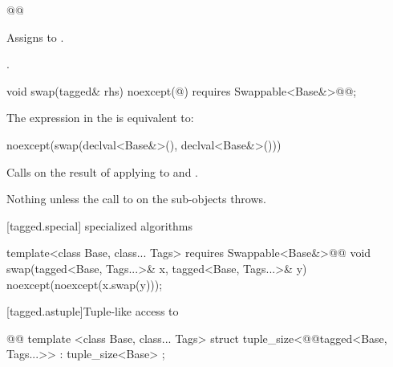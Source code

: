 {\begin{itemdescr}
\begin{codeblock}
@@
\end{codeblock}

\pnum
\effects Assigns  to .

\pnum
\returns {}.
\end{itemdescr}

\begin{itemdecl}
void swap(tagged& rhs) noexcept(@\seebelow@)
  requires Swappable<Base&>@\newtxt{()}@;
\end{itemdecl}

\begin{itemdescr}
\pnum
\remarks The expression in the  is equivalent to:

\begin{codeblock}
noexcept(swap(declval<Base&>(), declval<Base&>()))
\end{codeblock}

\pnum
\effects Calls  on the result of applying  to  and
.

\pnum
\throws Nothing unless the call to  on the  sub-objects throws.

\end{itemdescr}

[tagged.special]{ specialized algorithms}

%

\begin{itemdecl}
template<class Base, class... Tags>
  requires Swappable<Base&>@\newtxt{()}@
void swap(tagged<Base, Tags...>& x, tagged<Base, Tags...>& y)
  noexcept(noexcept(x.swap(y)));
\end{itemdecl}

\begin{itemdescr}
\pnum
\effects {}
\end{itemdescr}

[tagged.astuple]{Tuple-like access to }

%
%
\begin{itemdecl}
@@
  template <class Base, class... Tags>
  struct tuple_size<@@tagged<Base, Tags...>>
    : tuple_size<Base> { };


\end{itemdecl}}
